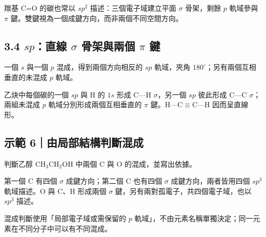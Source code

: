 \documentclass[11pt,a4paper]{article}
\begin{document}
羰基 C=O 的碳也常以 \(sp^2\) 描述：三個電子域建立平面 \(\sigma\) 骨架，剩餘 \(p\) 軌域參與 \(\pi\) 鍵。雙鍵視為一個成鍵方向，而非兩個不同空間方向。

\subsection{\texorpdfstring{3.4 \(sp\)：直線 \(\sigma\) 骨架與兩個 \(\pi\) 鍵}{3.4 sp：直線 \textbackslash sigma 骨架與兩個 \textbackslash pi 鍵}}\label{spux76f4ux7dda-sigma-ux9aa8ux67b6ux8207ux5169ux500b-pi-ux9375}

一個 \(s\) 與一個 \(p\) 混成，得到兩個方向相反的 \(sp\) 軌域，夾角 \(180^\circ\)；另有兩個互相垂直的未混成 \(p\) 軌域。

乙炔中每個碳的一個 \(sp\) 與 H 的 \(1s\) 形成 C---H \(\sigma\)，另一個 \(sp\) 彼此形成 C---C \(\sigma\)；兩組未混成 \(p\) 軌域分別形成兩個互相垂直的 \(\pi\) 鍵。H---C\(\equiv\)C---H 因而呈直線形。

\begin{HandoutWorkedExample}

\subsection{示範 6｜由局部結構判斷混成}\label{ux793aux7bc4-6ux7531ux5c40ux90e8ux7d50ux69cbux5224ux65b7ux6df7ux6210}

判斷乙醇 \(\mathrm{CH_3CH_2OH}\) 中兩個 C 與 O 的混成，並寫出依據。

第一個 C 有四個 \(\sigma\) 成鍵方向；第二個 C 也有四個 \(\sigma\) 成鍵方向，兩者皆用四個 \(sp^3\) 軌域描述。O 與 C、H 形成兩個 \(\sigma\) 鍵，另有兩對孤電子，共四個電子域，也以 \(sp^3\) 描述。

混成判斷使用「局部電子域或需保留的 \(p\) 軌域」，不由元素名稱單獨決定；同一元素在不同分子中可以有不同混成。

\end{HandoutWorkedExample}
\end{document}
